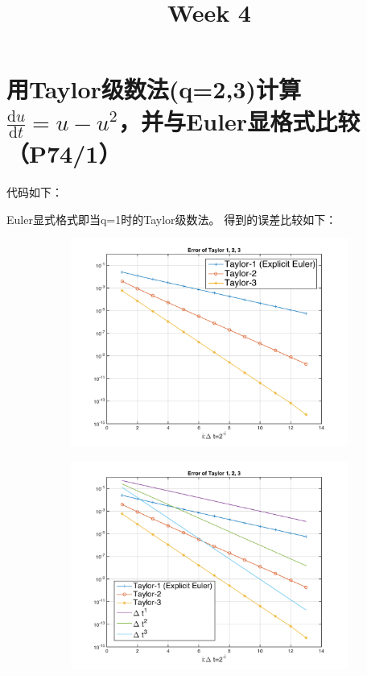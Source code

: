 \documentclass{homework}
\title{Week 4}
\date{}
\begin{document}
\maketitle
\section{用Taylor级数法(q=2,3)计算$\frac{\mathrm{d}u}{\mathrm{d}t}=u-u^2$，并与Euler显格式比较（P74/1）}
代码如下：

Euler显式格式即当q=1时的Taylor级数法。
得到的误差比较如下：
\begin{figure}[H]
\hspace{-5em}
\begin{subfigure}[t]{0.6\textwidth}
\centering
\includegraphics[width=\textwidth]{Taylor.png}
\end{subfigure}
\begin{subfigure}[t]{0.6\textwidth}
\centering
\includegraphics[width=\textwidth]{TwithD.png}
\end{subfigure}
\end{figure}
\end{document}
